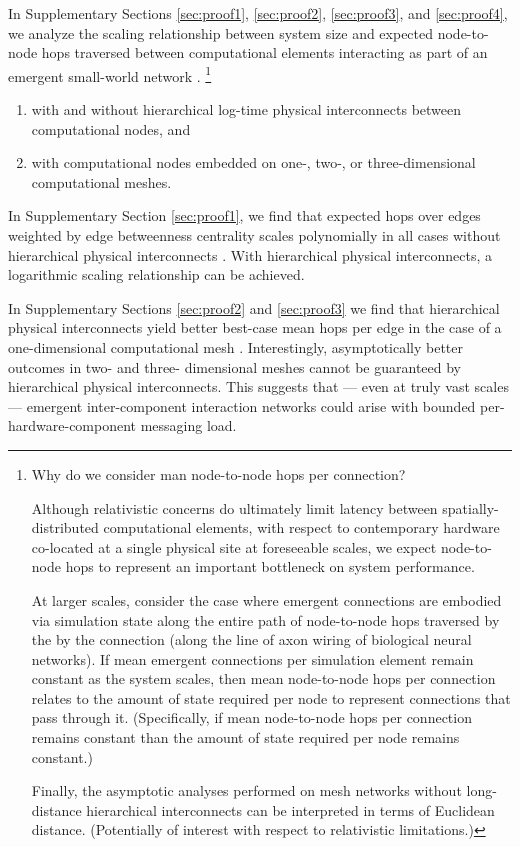 In Supplementary Sections \ref{sec:proof1}, \ref{sec:proof2}, \ref{sec:proof3}, and \ref{sec:proof4}, we analyze the scaling relationship between system size and expected node-to-node hops traversed between computational elements interacting as part of an emergent small-world network \citep{Moreno_Ofria_2020}.
\footnote{
Why do we consider man node-to-node hops per connection?

Although relativistic concerns do ultimately limit latency between spatially-distributed computational elements, with respect to contemporary hardware co-located at a single physical site at foreseeable scales, we expect node-to-node hops to represent an important bottleneck on system performance.

At larger scales, consider the case where emergent connections are embodied via simulation state along the entire path of node-to-node hops traversed by the by the connection (along the line of axon wiring of biological neural networks).
If mean emergent connections per simulation element remain constant as the system scales, then mean node-to-node hops per connection relates to the amount of state required per node to represent connections that pass through it.
(Specifically, if mean node-to-node hops per connection remains constant than the amount of state required per node remains constant.)

Finally, the asymptotic analyses performed on mesh networks without long-distance hierarchical interconnects can be interpreted in terms of Euclidean distance.
(Potentially of interest with respect to relativistic limitations.)
}
\begin{enumerate}
\item with and without hierarchical log-time physical interconnects between computational nodes, and
\item with computational nodes embedded on one-, two-, or three-dimensional computational meshes.
\end{enumerate}

In Supplementary Section \ref{sec:proof1}, we find that expected hops over edges weighted by edge betweenness centrality scales polynomially in all cases without hierarchical physical interconnects \citep{Moreno_Ofria_2020}.
With hierarchical physical interconnects, a logarithmic scaling relationship can be achieved.

In Supplementary Sections \ref{sec:proof2} and \ref{sec:proof3} we find that hierarchical physical interconnects yield better best-case mean hops per edge in the case of a one-dimensional computational mesh \citep{Moreno_Ofria_2020}.
Interestingly, asymptotically better outcomes in two- and three- dimensional meshes cannot be guaranteed by hierarchical physical interconnects.
This suggests that --- even at truly vast scales --- emergent inter-component interaction networks could arise with bounded per-hardware-component messaging load.

